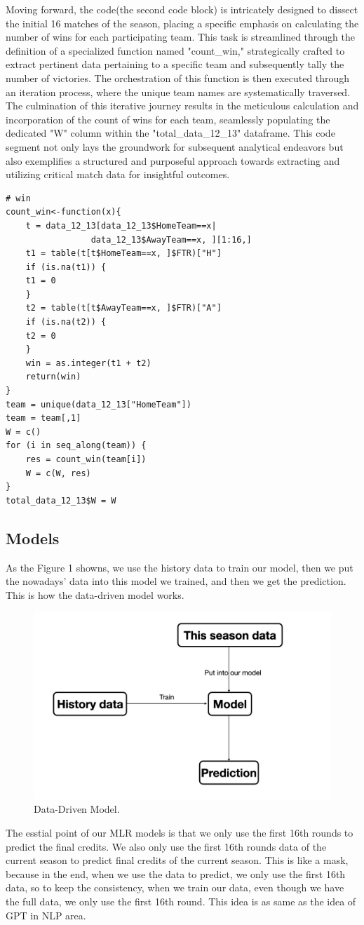 \documentclass[12pt]{article}
\begin{document}
Moving forward, the code(the second code block) is intricately designed to dissect the initial 16 matches of the season, placing a specific emphasis on calculating the number of wins for each participating team. This task is streamlined through the definition of a specialized function named "count\_win," strategically crafted to extract pertinent data pertaining to a specific team and subsequently tally the number of victories. The orchestration of this function is then executed through an iteration process, where the unique team names are systematically traversed. The culmination of this iterative journey results in the meticulous calculation and incorporation of the count of wins for each team, seamlessly populating the dedicated "W" column within the "total\_data\_12\_13" dataframe. This code segment not only lays the groundwork for subsequent analytical endeavors but also exemplifies a structured and purposeful approach towards extracting and utilizing critical match data for insightful outcomes.
\begin{lstlisting}
# win
count_win<-function(x){
    t = data_12_13[data_12_13$HomeTeam==x|
                 data_12_13$AwayTeam==x, ][1:16,]
    t1 = table(t[t$HomeTeam==x, ]$FTR)["H"]
    if (is.na(t1)) {
    t1 = 0
    }
    t2 = table(t[t$AwayTeam==x, ]$FTR)["A"]
    if (is.na(t2)) {
    t2 = 0
    }
    win = as.integer(t1 + t2)
    return(win)
}
team = unique(data_12_13["HomeTeam"])
team = team[,1]
W = c()
for (i in seq_along(team)) {
    res = count_win(team[i])
    W = c(W, res)
}
total_data_12_13$W = W
\end{lstlisting}
\subsection{Models}
As the Figure 1 showns, we use the history data to train our model, then we put the nowadays’ data into this model we trained, and then we get the prediction. This is how the data-driven model works.

\begin{figure}[h]
    \centering
    \includegraphics[width=0.6\linewidth]{1.png}
    \caption{Data-Driven Model.}
\end{figure}
The esstial point of our MLR models is that we only use the first 16th rounds to predict the final credits. We also only use the first 16th rounds data of the current season to predict final credits of the current season. This is like a mask, because in the end, when we use the data to predict, we only use the first 16th data, so to keep the consistency, when we train our data, even though we have the full data, we only use the first 16th round. This idea is as same as the idea of GPT in NLP area.
\end{document}
